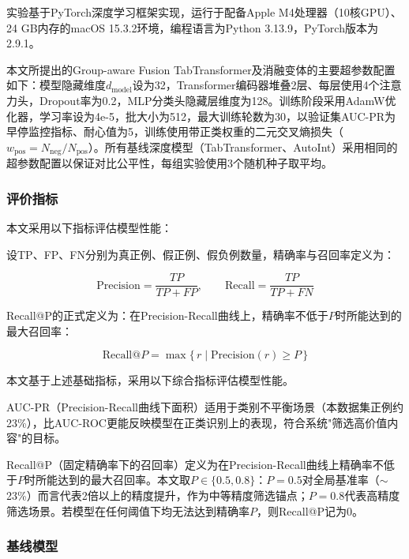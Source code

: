 实验基于PyTorch深度学习框架实现，运行于配备Apple M4处理器（10核GPU）、24 GB内存的macOS 15.3.2环境，编程语言为Python 3.13.9，PyTorch版本为2.9.1。

本文所提出的Group-aware Fusion TabTransformer及消融变体的主要超参数配置如下：模型隐藏维度$d_{\text{model}}$设为32，Transformer编码器堆叠2层、每层使用4个注意力头，Dropout率为0.2，MLP分类头隐藏层维度为128。训练阶段采用AdamW优化器\cite{loshchilov2019decoupled}，学习率设为4e-5，批大小为512，最大训练轮数为30，以验证集AUC-PR为早停监控指标、耐心值为5，训练使用带正类权重的二元交叉熵损失（$w_{\text{pos}} = N_{\text{neg}}/N_{\text{pos}}$）。所有基线深度模型（TabTransformer、AutoInt）采用相同的超参数配置以保证对比公平性，每组实验使用3个随机种子取平均。

\subsubsection{评价指标}

本文采用以下指标评估模型性能：

设TP、FP、FN分别为真正例、假正例、假负例数量，精确率与召回率定义为：

\begin{equation}
\text{Precision} = \frac{TP}{TP + FP}, \qquad \text{Recall} = \frac{TP}{TP + FN}
\end{equation}

Recall@P的正式定义为：在Precision-Recall曲线上，精确率不低于$P$时所能达到的最大召回率：

\begin{equation}
\text{Recall@}P = \max\{\,r \mid \text{Precision}(r) \geq P\,\}
\end{equation}

本文基于上述基础指标，采用以下综合指标评估模型性能。

AUC-PR（Precision-Recall曲线下面积）适用于类别不平衡场景（本数据集正例约23\%），比AUC-ROC更能反映模型在正类识别上的表现\cite{davis2006relationship}，符合系统"筛选高价值内容"的目标。

Recall@P（固定精确率下的召回率）定义为在Precision-Recall曲线上精确率不低于$P$时所能达到的最大召回率。本文取$P \in \{0.5, 0.8\}$：$P=0.5$对全局基准率（$\sim$23\%）而言代表2倍以上的精度提升，作为中等精度筛选锚点；$P=0.8$代表高精度筛选场景。若模型在任何阈值下均无法达到精确率$P$，则Recall@P记为0。

\subsubsection{基线模型}

